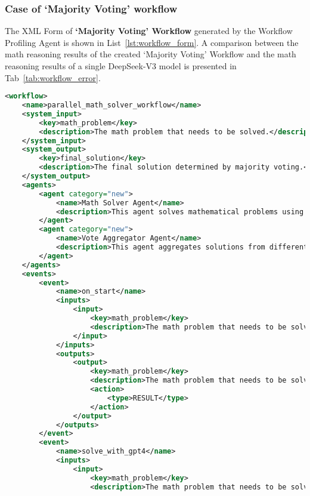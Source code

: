 \subsubsection{Case of `Majority Voting' workflow}
The XML Form of \textbf{`Majority Voting' Workflow} generated by the {Workflow Profiling Agent} is shown in List~\ref{lst:workflow_form}. A comparison between the math reasoning results of the created `Majority Voting' Workflow and the math reasoning results of a single DeepSeek-V3 model is presented in Tab~\ref{tab:workflow_error}.
\begin{lstlisting}[basicstyle=\ttfamily\footnotesize, frame=shadowbox, columns=fullflexible, breaklines=true, breakatwhitespace=true, breakindent=3pt, language=XML, xleftmargin=0.02\linewidth, xrightmargin=0.02\linewidth, caption={AI-generated Creation Profile of \textbf{`Majority Voting' workflow}}, label={lst:workflow_form}]
<workflow>
    <name>parallel_math_solver_workflow</name>
    <system_input>
        <key>math_problem</key>
        <description>The math problem that needs to be solved.</description>
    </system_input>
    <system_output>
        <key>final_solution</key>
        <description>The final solution determined by majority voting.</description>
    </system_output>
    <agents>
        <agent category="new">
            <name>Math Solver Agent</name>
            <description>This agent solves mathematical problems using analytical and systematic approaches.</description>
        </agent>
        <agent category="new">
            <name>Vote Aggregator Agent</name>
            <description>This agent aggregates solutions from different solvers and determines the final answer through majority voting.</description>
        </agent>
    </agents>
    <events>
        <event>
            <name>on_start</name>
            <inputs>
                <input>
                    <key>math_problem</key>
                    <description>The math problem that needs to be solved.</description>
                </input>
            </inputs>
            <outputs>
                <output>
                    <key>math_problem</key>
                    <description>The math problem that needs to be solved.</description>
                    <action>
                        <type>RESULT</type>
                    </action>
                </output>
            </outputs>
        </event>
        <event>
            <name>solve_with_gpt4</name>
            <inputs>
                <input>
                    <key>math_problem</key>
                    <description>The math problem that needs to be solved.</description>

\end{lstlisting}
